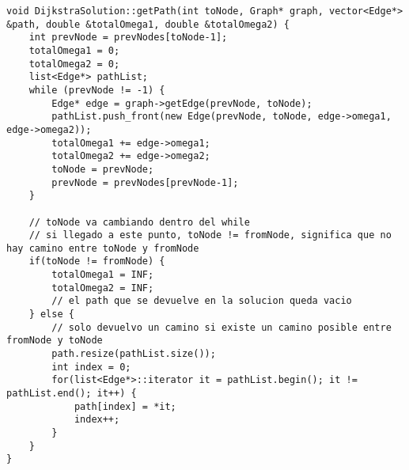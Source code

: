 \begin{lstlisting}[caption=DijkstraSolution::getPath()]
void DijkstraSolution::getPath(int toNode, Graph* graph, vector<Edge*> &path, double &totalOmega1, double &totalOmega2) {	
    int prevNode = prevNodes[toNode-1];
    totalOmega1 = 0;
    totalOmega2 = 0;        
    list<Edge*> pathList;
    while (prevNode != -1) {
    	Edge* edge = graph->getEdge(prevNode, toNode);
        pathList.push_front(new Edge(prevNode, toNode, edge->omega1, edge->omega2));
        totalOmega1 += edge->omega1;
        totalOmega2 += edge->omega2;
        toNode = prevNode;
        prevNode = prevNodes[prevNode-1];
    }        

    // toNode va cambiando dentro del while
    // si llegado a este punto, toNode != fromNode, significa que no hay camino entre toNode y fromNode    
    if(toNode != fromNode) {
        totalOmega1 = INF;
        totalOmega2 = INF;
        // el path que se devuelve en la solucion queda vacio
    } else {
        // solo devuelvo un camino si existe un camino posible entre fromNode y toNode
        path.resize(pathList.size());
        int index = 0;
        for(list<Edge*>::iterator it = pathList.begin(); it != pathList.end(); it++) {
            path[index] = *it;
            index++;
        }
    }
} 
\end{lstlisting}
